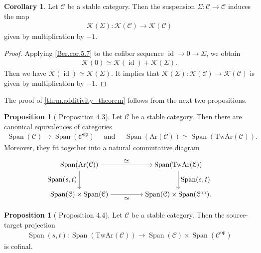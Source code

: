 \documentclass[a4paper,dvipdfmx,11pt,reqno]{amsart}
\DeclareMathOperator{\myop}{op}
\DeclareMathOperator{\id}{id}
\newcommand{\C}{\mathcal{C}}
\newcommand{\K}{\mathcal{K}}
\DeclareMathOperator{\Span}{Span}
\newcommand{\Ar}{\mathrm{Ar}}
\newcommand{\TwAr}{\mathrm{TwAr}}
\theoremstyle{definition}
\newtheorem{corollary}[theorem]{Corollary}
\newtheorem{proposition}[theorem]{Proposition}
\begin{document}
\begin{corollary} \label{Ber.cor.5.8}
  Let $\C$ be a stable category.
  Then the suspension $\Sigma : \C \to \C$ induces the map 
  \begin{align*}
    \K(\Sigma) : \K(\C) \to \K(\C) 
  \end{align*}
  given by multiplication by $-1$.
\end{corollary}

\begin{proof}
  Applying \cref{Ber.cor.5.7} to the cofiber sequence $\id \to 0 \to \Sigma$, we obtain 
  \begin{align*}
    \K(0) 
    \simeq \K(\id) + \K(\Sigma).
  \end{align*}
  Then we have $\K(\id) \simeq \K(\Sigma)$.
  It implies that $\K(\Sigma) : \K(\C) \to \K(\C)$ is given by multiplication by $-1$.
\end{proof}

The proof of \cref{thrm.additivity_theorem} follows from the next two propositions.

\begin{proposition}[\cite{HLS23} Proposition 4.3] \label{HLS23.prop.4.3}
  Let $\C$ be a stable category.
  Then there are canonical equivalences of categories
  \begin{align*}
    \Span(\C) \to \Span(\C^{\myop}) 
    \quad \text{ and } \quad 
    \Span(\Ar(\C)) \simeq \Span(\TwAr(\C)).
  \end{align*}
  Moreover, they fit together into a natural commutative diagram 
  \[\begin{tikzpicture}[auto,->] 
    \node (tl) at (0,1.5) {$\Span(\Ar(\C))$}; 
    \node (tr) at (5,1.5) {$\Span(\TwAr(\C))$};
    \node (bl) at (0,0) {$\Span(\C) \times \Span(\C)$}; 
    \node (br) at (5,0) {$\Span(\C) \times \Span(\C^{\myop}).$}; 
    \draw (tl) -- node {$\simeq$} (tr); 
    \draw (bl) -- node[swap] {$\simeq$} (br); 
    \draw (tl) -- node[swap] {$\Span(s,t)$} (bl);
    \draw (tr) -- node {$\Span(s,t)$} (br); 
  \end{tikzpicture}\]
\end{proposition}

\begin{proposition}[\cite{HLS23} Proposition 4.4] \label{HLS23.prop.4.4}
  Let $\C$ be a stable category.
  Then the source-target projection 
  \begin{align*}
    \Span(s,t) : \Span(\TwAr(\C)) \to \Span(\C) \times \Span(\C^{\myop})
  \end{align*}
  is cofinal.
\end{proposition}
\end{document}
